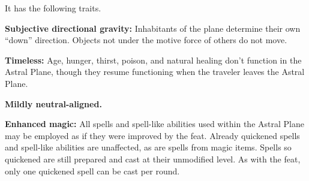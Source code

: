 It has the following traits.
\begin{itemize*}
\item \textbf{Subjective directional gravity:} Inhabitants of the plane determine their own ``down'' direction. Objects not under the motive force of others do not move.
\item \textbf{Timeless:} Age, hunger, thirst, poison, and natural healing don't function in the Astral Plane, though they resume functioning when the traveler leaves the Astral Plane.
\item \textbf{Mildly neutral-aligned.}
\item \textbf{Enhanced magic:} All spells and spell-like abilities used within the Astral Plane may be employed as if they were improved by the  feat. Already quickened spells and spell-like abilities are unaffected, as are spells from magic items. Spells so quickened are still prepared and cast at their unmodified level. As with the  feat, only one quickened spell can be cast per round.
\end{itemize*}
